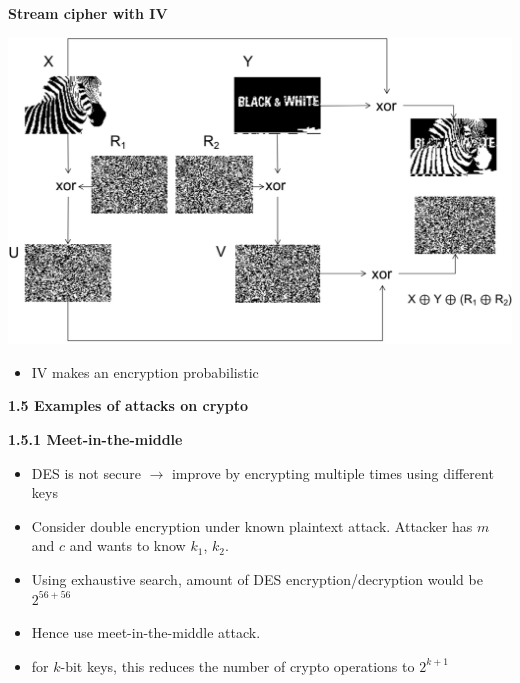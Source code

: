 \documentclass[landscape,a4paper]{extarticle}
\newenvironment{Figure}
  {\par\noindent\minipage{\linewidth}}
  {\endminipage\par\medskip}
\begin{document}
\begin{multicols*}{5}
    \textbf{Stream cipher with IV}
    \begin{Figure}
        \centering
        \includegraphics[width=\linewidth]{stream_cipher_with_iv.png}        
    \end{Figure}

    \begin{itemize}
        \item IV makes an encryption probabilistic
    \end{itemize}
    
    \textbf{1.5 Examples of attacks on crypto}

    \textbf{1.5.1 Meet-in-the-middle}

    \begin{itemize}
        \item DES is not secure $\rightarrow$ improve by encrypting multiple times using different
        keys
        \item Consider double encryption under known plaintext attack. Attacker has $m$ and $c$ and
        wants to know $k_1$, $k_2$.
        \item Using exhaustive search, amount of DES encryption/decryption would be $2^{56+56}$
        \item Hence use meet-in-the-middle attack.
        \item for $k$-bit keys, this reduces the number of crypto operations to $2^{k + 1}$
    \end{itemize}


\end{multicols*}
\end{document}
